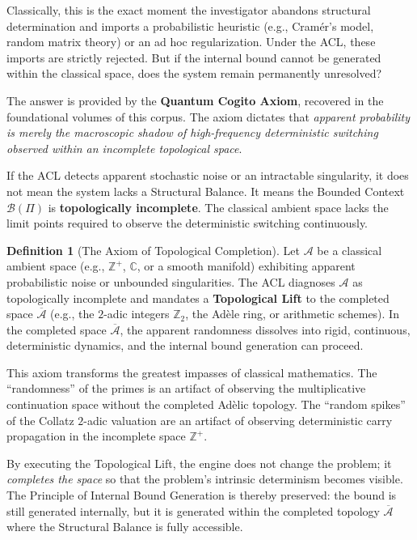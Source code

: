 \documentclass[12pt,openany]{extbook}
\theoremstyle{plain}
\theoremstyle{definition}
\newtheorem{definition}{Definition}[chapter]
\begin{document}
Classically, this is the exact moment the investigator abandons structural determination and imports a probabilistic heuristic (e.g., Cram\'er's model, random matrix theory) or an ad hoc regularization. Under the ACL, these imports are strictly rejected. But if the internal bound cannot be generated within the classical space, does the system remain permanently unresolved?

The answer is provided by the \textbf{Quantum Cogito Axiom}, recovered in the foundational volumes of this corpus. The axiom dictates that \emph{apparent probability is merely the macroscopic shadow of high-frequency deterministic switching observed within an incomplete topological space}.

If the ACL detects apparent stochastic noise or an intractable singularity, it does not mean the system lacks a Structural Balance. It means the Bounded Context $\mathcal{B}(\Pi)$ is \textbf{topologically incomplete}. The classical ambient space lacks the limit points required to observe the deterministic switching continuously.

\begin{definition}[The Axiom of Topological Completion]
Let $\mathcal{A}$ be a classical ambient space (e.g., $\mathbb{Z}^+$, $\mathbb{C}$, or a smooth manifold) exhibiting apparent probabilistic noise or unbounded singularities. The ACL diagnoses $\mathcal{A}$ as topologically incomplete and mandates a \textbf{Topological Lift} to the completed space $\overline{\mathcal{A}}$ (e.g., the $2$-adic integers $\mathbb{Z}_2$, the Ad\`ele ring, or arithmetic schemes). In the completed space $\overline{\mathcal{A}}$, the apparent randomness dissolves into rigid, continuous, deterministic dynamics, and the internal bound generation can proceed.
\end{definition}

This axiom transforms the greatest impasses of classical mathematics. The ``randomness'' of the primes is an artifact of observing the multiplicative continuation space without the completed Ad\`elic topology. The ``random spikes'' of the Collatz $2$-adic valuation are an artifact of observing deterministic carry propagation in the incomplete space $\mathbb{Z}^+$.

By executing the Topological Lift, the engine does not change the problem; it \emph{completes the space} so that the problem's intrinsic determinism becomes visible. The Principle of Internal Bound Generation is thereby preserved: the bound is still generated internally, but it is generated within the completed topology $\overline{\mathcal{A}}$ where the Structural Balance is fully accessible.
\end{document}
